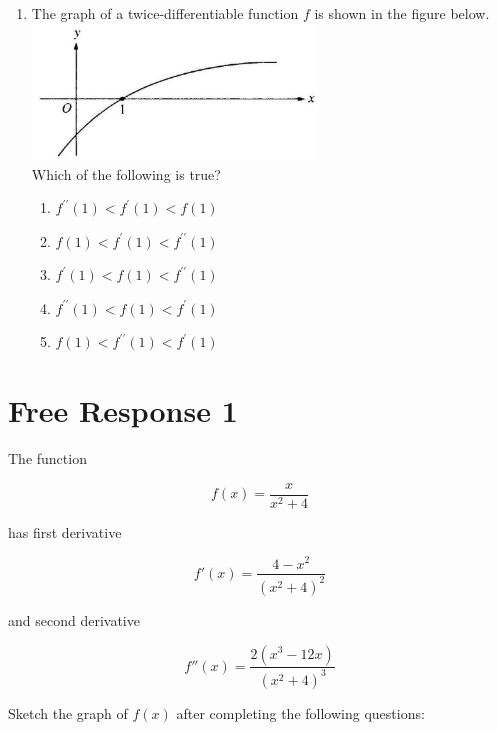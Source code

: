 \documentclass{article}
\begin{document}
\begin{enumerate}
	\item
	\begin{minipage}[t]{\linewidth}
		The graph of a twice-differentiable function \(f\) is shown in the
figure below.\\
\includegraphics[width=2.9833333333333334in]{media/d7b0a695-c4ff-5482-a58c-e1186654c6aa.jpg}\\
Which of the following is true?
\vspace{1em}
		\begin{enumerate}
		\itemsep1em
			\item \(f^{\prime \prime}(1)<f^{\prime}(1)<f(1)\)
			\item \(f(1)<f^{\prime}(1)<f^{\prime \prime}(1)\)
			\item \(f^{\prime}(1)<f(1)<f^{\prime \prime}(1)\)
			\item \(f^{\prime \prime}(1)<f(1)<f^{\prime}(1)\)
			\item \(f(1)<f^{\prime \prime}(1)<f^{\prime}(1)\)
		\end{enumerate}
	\end{minipage}
\end{enumerate}


\clearpage
\section{Free Response 1}

The function

$$
f(x)=\frac{x}{x^{2}+4}
$$

has first derivative

$$
f'(x) = \frac{4-x^2}{\left(x^2+4\right)^2}
$$

and second derivative

$$
f''(x) = \frac{2 \left(x^3-12 x\right)}{\left(x^2+4\right)^3}
$$

Sketch the graph of $f(x)$ after completing the following questions:
\end{document}

